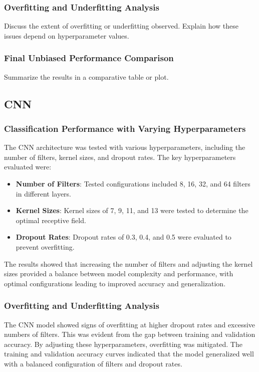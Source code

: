 \subsubsection{Overfitting and Underfitting Analysis}
Discuss the extent of overfitting or underfitting observed. Explain how these issues depend on hyperparameter values.
\subsubsection{Final Unbiased Performance Comparison}
Summarize the results in a comparative table or plot.

\subsection{CNN}
\subsubsection{Classification Performance with Varying Hyperparameters}
The CNN architecture was tested with various hyperparameters, including the number of filters, kernel sizes, and dropout rates. The key hyperparameters evaluated were:
\begin{itemize}
    \item \textbf{Number of Filters}: Tested configurations included 8, 16, 32, and 64 filters in different layers.
    \item \textbf{Kernel Sizes}: Kernel sizes of 7, 9, 11, and 13 were tested to determine the optimal receptive field.
    \item \textbf{Dropout Rates}: Dropout rates of 0.3, 0.4, and 0.5 were evaluated to prevent overfitting.
\end{itemize}
The results showed that increasing the number of filters and adjusting the kernel sizes provided a balance between model complexity and performance, with optimal configurations leading to improved accuracy and generalization.

\subsubsection{Overfitting and Underfitting Analysis}
The CNN model showed signs of overfitting at higher dropout rates and excessive numbers of filters. This was evident from the gap between training and validation accuracy. By adjusting these hyperparameters, overfitting was mitigated. The training and validation accuracy curves indicated that the model generalized well with a balanced configuration of filters and dropout rates.

